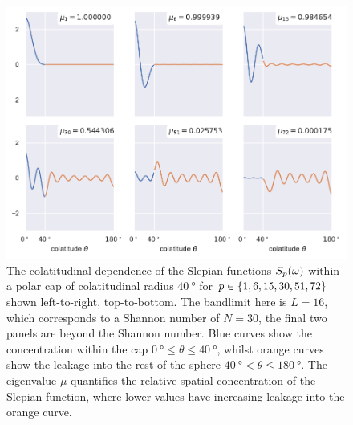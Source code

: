 \begin{figure}[htpb]
	\centering\capstart{}
	\includegraphics[width=\textwidth]{slepian_colatitude.pdf}
	\caption[
		The colatitudinal dependence of the polar cap Slepian functions
	]{
		The colatitudinal dependence of the Slepian functions \({S}_{p}(\omega)\) within a polar cap of colatitudinal radius \(\SI{40}{\degree}\) for \(p \in \{1, 6, 15, 30, 51, 72\}\) shown left-to-right, top-to-bottom.
		The bandlimit here is  \(L=16\), which corresponds to a Shannon number of \(N=30\), \ie{} the final two panels are beyond the Shannon number.
		Blue curves show the concentration within the cap \(\SI{0}{\degree} \leq \theta \leq \SI{40}{\degree}\), whilst orange curves show the leakage into the rest of the sphere \(\SI{40}{\degree} < \theta \leq \SI{180}{\degree}\).
		The eigenvalue \(\mu{}\) quantifies the relative spatial concentration of the Slepian function, where lower values have increasing leakage into the orange curve.
	}\label{fig:chapter2_slepian_colatitude}
\end{figure}

